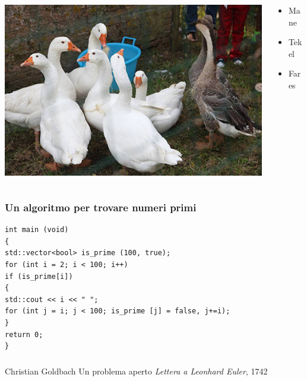\documentclass[xcolor=dvipsnames,aspectratio=169]{beamer}
\begin{document}
{\begin{frame}
\begin{columns}
\begin{column}{0.4\textwidth}
\includegraphics[width=\columnwidth]{Immagini/duck.jpg}
\end{column}

\begin{column}{0.4\textwidth}
\begin{itemize}
\item Mane
\item Tekel
\item Fares
\end{itemize}
\end{column}

\end{columns}
\end{frame}


\begin{frame}[fragile]
\frametitle{Un algoritmo per trovare numeri primi}
\begin{verbatim}
int main (void)
{
std::vector<bool> is_prime (100, true);
for (int i = 2; i < 100; i++)
if (is_prime[i])
{
std::cout << i << " ";
for (int j = i; j < 100; is_prime [j] = false, j+=i);
}
return 0;
}
\end{verbatim}
\end{frame}


\begin{frame}
\frametitle{\refname}
\begin{thebibliography}{9}
 Christian Goldbach
\newblock Un problema aperto
\newblock \emph{Lettera a Leonhard Euler}, 1742
\end{thebibliography}
\end{frame}

} %
\end{document}
